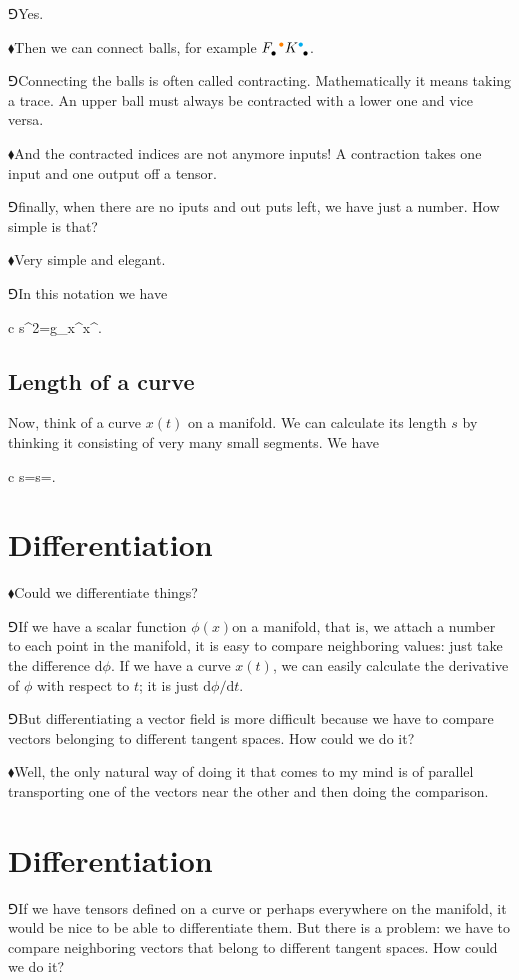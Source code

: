 \documentclass[10pt,oneside%
]{memoir}
\newenvironment{eqna}{\begin{IEEEeqnarray*}{c}}{\end{IEEEeqnarray*}\ignorespacesafterend}
\newcommand{\dd}{\mathrm{d}}
\newcommand{\tensay}[3]{#1_{#2}^{\phantom{#2}#3}}
\newcommand{\tensya}[3]{#1^{#2}_{\phantom{#2}#3}}
\newcommand{\coa}{{\color{black}\bullet}}
\newcommand{\cob}{{\color{oranssi}\bullet}}
\newcommand{\coc}{{\color{cyan}\bullet}}
\newcommand{\hea}{\(\blacklozenge\)\;}
\newcommand{\heb}{\(\Game\)\;}
\begin{document}
\heb Yes.

\hea Then we can connect balls, for example \(\tensay{F}{\coa}{\cob}\tensya{K}{\coc}{\coa}\).

\heb Connecting the balls is often called contracting. Mathematically it means taking a trace. An upper ball must always be contracted with a lower one and vice versa.

\hea And the contracted indices are not anymore inputs! A contraction takes one input and one output off a tensor.

\heb finally, when there are no iputs and out puts left, we have just a number. How simple is that?

\hea Very simple and elegant.

\heb In this notation we have
\begin{eqna}
    \dd s^2=g_{\coa\cob}\dd x^\coa\dd x^\cob.
\end{eqna}
\subsection{Length of a curve}
Now, think of a curve \(x(t)\) on a manifold. We can calculate its length \(s\) by thinking it consisting of very many small segments. We have
\begin{eqna}
    s=\int\dd s=\int\sqrt{g_{\coa\cob}\dd x^\coa\dd x^\cob}.
\end{eqna}
\section{Differentiation}
\hea Could we differentiate things?

\heb If we have a scalar function \(\phi(x)\)on a manifold, that is, we attach a number to each point in the manifold, it is easy to compare neighboring values: just take the difference \(\dd\phi\). If we have a curve \(x(t)\), we can easily calculate the derivative of \(\phi\) with respect to \(t\); it is just \(\dd\phi/\dd t\).

\heb But differentiating a vector field is more difficult because we have to compare vectors belonging to different tangent spaces. How could we do it?

\hea Well, the only natural way of doing it that comes to my mind is of parallel transporting one of the vectors near the other and then doing the comparison.
\section{Differentiation}
\heb If we have tensors defined on a curve or perhaps everywhere on the manifold, it would be nice to be able to differentiate them. But there is a problem: we have to compare neighboring vectors that belong to different tangent spaces. How could we do it?
\end{document}
